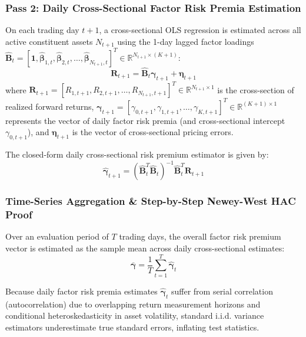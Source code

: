 \subsubsection{Pass 2: Daily Cross-Sectional Factor Risk Premia Estimation}
On each trading day $t+1$, a cross-sectional OLS regression is estimated across all active constituent assets $N_{t+1}$ using the 1-day lagged factor loadings $\hat{\mathbf{B}}_t = [\mathbf{1}, \hat{\boldsymbol{\beta}}_{1,t}, \hat{\boldsymbol{\beta}}_{2,t}, \dots, \hat{\boldsymbol{\beta}}_{N_{t+1},t}]^T \in \mathbb{R}^{N_{t+1} \times (K+1)}$:
\begin{equation}
\mathbf{R}_{t+1} = \hat{\mathbf{B}}_t \boldsymbol{\gamma}_{t+1} + \boldsymbol{\eta}_{t+1}
\label{eq:ch3_pass2_ols}
\end{equation}
where $\mathbf{R}_{t+1} = [R_{1,t+1}, R_{2,t+1}, \dots, R_{N_{t+1},t+1}]^T \in \mathbb{R}^{N_{t+1} \times 1}$ is the cross-section of realized forward returns, $\boldsymbol{\gamma}_{t+1} = [\gamma_{0,t+1}, \gamma_{1,t+1}, \dots, \gamma_{K,t+1}]^T \in \mathbb{R}^{(K+1) \times 1}$ represents the vector of daily factor risk premia (and cross-sectional intercept $\gamma_{0,t+1}$), and $\boldsymbol{\eta}_{t+1}$ is the vector of cross-sectional pricing errors.

The closed-form daily cross-sectional risk premium estimator is given by:
\begin{equation}
\hat{\boldsymbol{\gamma}}_{t+1} = \left( \hat{\mathbf{B}}_t^T \hat{\mathbf{B}}_t \right)^{-1} \hat{\mathbf{B}}_t^T \mathbf{R}_{t+1}
\label{eq:ch3_gamma_hat}
\end{equation}

\subsubsection{Time-Series Aggregation \& Step-by-Step Newey-West HAC Proof}
Over an evaluation period of $T$ trading days, the overall factor risk premium vector is estimated as the sample mean across daily cross-sectional estimates:
\begin{equation}
\bar{\boldsymbol{\gamma}} = \frac{1}{T} \sum_{t=1}^T \hat{\boldsymbol{\gamma}}_t
\end{equation}

Because daily factor risk premia estimates $\hat{\boldsymbol{\gamma}}_t$ suffer from serial correlation (autocorrelation) due to overlapping return measurement horizons and conditional heteroskedasticity in asset volatility, standard i.i.d. variance estimators underestimate true standard errors, inflating test statistics.

